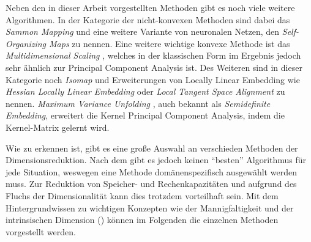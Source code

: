 
Neben den in dieser Arbeit vorgestellten Methoden gibt es noch viele weitere Algorithmen. In der
Kategorie der nicht-konvexen Methoden sind dabei das \textit{Sammon Mapping} \parencite{Sammon.1969} und eine weitere Variante von neuronalen Netzen, den \textit{Self-Organizing
	Maps} \parencite{Kohonen.1990} zu nennen. Eine weitere wichtige konvexe Methode ist das
\textit{Multidimensional Scaling} \parencites{Kruskal.1964}{Cox.2008}, welches in der klassischen Form im Ergebnis jedoch sehr ähnlich
zur Principal Component Analysis ist. Des Weiteren sind in dieser Kategorie noch \textit{Isomap} \parencite{Tenenbaum.2000} und Erweiterungen von Locally Linear Embedding wie \textit{Hessian Locally
	Linear Embedding} \parencite{Donoho.2003} oder \textit{Local Tangent Space Alignment} \parencite{Zhang.2002} zu nennen. \textit{Maximum Variance Unfolding} \parencite{Weinberger.2006}, auch bekannt als \textit{Semidefinite Embedding}, erweitert die Kernel
Principal Component Analysis, indem die Kernel-Matrix gelernt wird.

Wie zu erkennen ist, gibt es eine große Auswahl an verschieden Methoden der Dimensionsreduktion.
Nach dem  \parencite{Wolpert.1997} gibt es jedoch keinen \enquote{besten} Algorithmus für jede Situation,
weswegen eine Methode domänenspezifisch ausgewählt werden muss. Zur Reduktion von Speicher- und
Rechenkapazitäten und aufgrund des Fluchs der Dimensionalität kann dies trotzdem vorteilhaft sein.
Mit dem Hintergrundwissen zu wichtigen Konzepten wie der Mannigfaltigkeit und der intrinsischen
Dimension () können im Folgenden die
einzelnen Methoden vorgestellt werden.